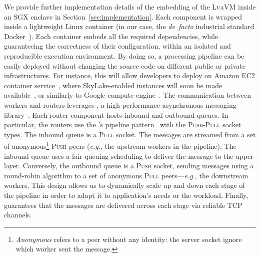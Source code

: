 We provide further implementation details of the embedding of the \textsc{LuaVM} inside an SGX enclave in Section~\ref{sec:implementation}.
% 
Each component is wrapped inside a lightweight Linux container (in our case, the \emph{de~facto} industrial standard Docker~\cite{docker}).
Each container embeds all the required dependencies, while guaranteeing the correctness of their configuration, within an isolated and reproducible execution environment.
By doing so, a \SYS{} processing pipeline can be easily deployed without changing the source code on different public or private infrastructures.
For instance, this will allow developers to deploy \SYS{} on Amazon EC2 container service~\cite{awsec2container}, where SkyLake-enabled instances will soon be made available~\cite{amazonskylake}, or similarly to Google compute engine~\cite{gceskylake}.
% 
The communication between workers and routers leverages \zmq{}, a high-performance asynchronous messaging library~\cite{zero_mq}.
Each router component hosts inbound and outbound queues.
In particular, the routers use the \zmq's pipeline pattern~\cite{zero_mq:pipeline} with the \textsc{Push}-\textsc{Pull} socket types. 
% 
The inbound queue is a \textsc{Pull} socket.
The messages are streamed from a set of anonymous\footnote{\emph{Anonymous} refers to a peer without any identity: the server socket ignore which worker sent the message.} \textsc{Push} peers (\emph{e.g.}, the upstream workers in the pipeline).
The inbound queue uses a fair-queuing scheduling to deliver the message to the upper layer.
Conversely, the outbound queue is a \textsc{Push} socket, sending messages using a round-robin algorithm to a set of anonymous \textsc{Pull} peers---\emph{e.g.}, the downstream workers.
% 
This design allows us to dynamically scale up and down each stage of the pipeline in order to adapt it to application's needs or the workload.
Finally, \zmq{} guarantees that the messages are delivered across each stage via reliable TCP channels.

